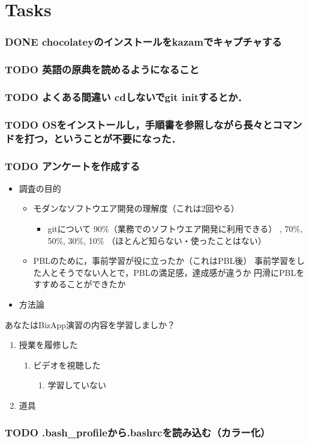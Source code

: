 \documentclass[t, aspectratio=169]{beamer}
\begin{document}
\part{Tasks}
\label{sec-18}
\section{{\bfseries\sffamily DONE} chocolateyのインストールをkazamでキャプチャする}
\label{sec-18-1}
\section{{\bfseries\sffamily TODO} 英語の原典を読めるようになること}
\label{sec-18-2}
\section{{\bfseries\sffamily TODO} よくある間違い cdしないでgit initするとか．}
\label{sec-18-3}
\section{{\bfseries\sffamily TODO} OSをインストールし，手順書を参照しながら長々とコマンドを打つ，ということが不要になった．}
\label{sec-18-4}
\section{{\bfseries\sffamily TODO} アンケートを作成する}
\label{sec-18-5}
\begin{itemize}
\item 調査の目的
\begin{itemize}
\item モダンなソフトウエア開発の理解度（これは2回やる）
\begin{itemize}
\item gitについて
90\%（業務でのソフトウエア開発に利用できる）
  , 70\%, 50\%, 30\%,
10\% （ほとんど知らない・使ったことはない）
\end{itemize}
\item PBLのために，事前学習が役に立ったか（これはPBL後）
事前学習をした人とそうでない人とで，PBLの満足感，達成感が違うか
円滑にPBLをすすめることができたか
\end{itemize}

\item 方法論
\end{itemize}
あなたはBizApp演習の内容を学習しましか？
\begin{enumerate}
\item 授業を履修した
\begin{enumerate}
\item ビデオを視聴した
\begin{enumerate}
\item 学習していない
\end{enumerate}
\end{enumerate}
\item 道具
\end{enumerate}
\section{{\bfseries\sffamily TODO} .bash\_profileから.bashrcを読み込む（カラー化）}
\label{sec-18-6}
\end{document}
